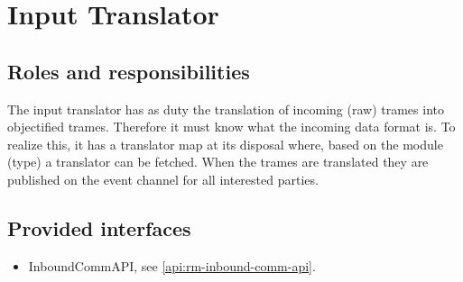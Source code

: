 \section{Input Translator}
\label{element:rm-input-translator}

\subsection{Roles and responsibilities}

\npar The input translator has as duty the translation of incoming (raw) trames
into objectified trames. Therefore it must know what the incoming data format
is. To realize this, it has a translator map at its disposal where, based on
the module (type) a translator can be fetched. When the trames are translated
they are published on the event channel for all interested parties.

\subsection{Provided interfaces}

\begin{itemize}
  \item InboundCommAPI, see \ref{api:rm-inbound-comm-api}.
\end{itemize}